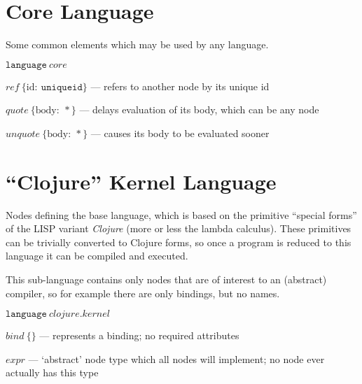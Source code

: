 \documentclass[110pt]{amsart}
\newcommand{\keyword}[1]{\ensuremath{\mathtt{#1}}}
\newcommand{\node}[2]{\ensuremath{#1 \: \{ #2 \}}}
\newcommand{\attr}[2]{\ensuremath{\mathrm{#1} : \: #2}}
\begin{document}
\section{Core Language}
Some common elements which may be used by any language.

\vspace{12pt}

$\keyword{language} \: core$





\vspace{12pt}

$\node{ref}{\attr{id}{\keyword{uniqueid}}} $ --- refers to another node by its unique id


\vspace{12pt}

$\node{quote}{\attr{body}{*}}$ --- delays evaluation of its body, which can be any node

$\node{unquote}{\attr{body}{*}}$ --- causes its body to be evaluated sooner


\section{``Clojure'' Kernel Language}
Nodes defining the base language, which is based on the primitive ``special forms'' of the LISP variant \emph{Clojure} (more or less the lambda calculus). These primitives can be trivially converted to Clojure forms, so once a program is reduced to this language it can be compiled and executed.

This sub-language contains only nodes that are of interest to an (abstract) compiler, so for example there are only bindings, but no names.


\vspace{12pt}

$\keyword{language} \: clojure.kernel$


\vspace{12pt}

$\node{bind}{}$ --- represents a binding; no required attributes


\vspace{12pt}

$expr$ --- `abstract' node type which all nodes will implement; no node ever actually has this type
\end{document}
